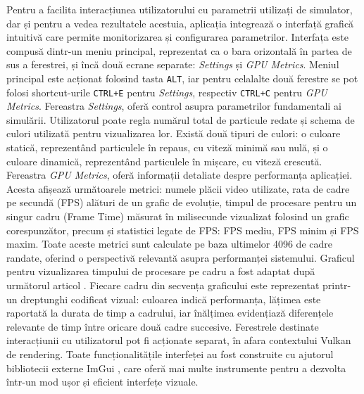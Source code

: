 Pentru a facilita interacțiunea utilizatorului cu parametrii utilizați de simulator, dar și pentru a vedea rezultatele acestuia, aplicația integrează o interfață grafică intuitivă care permite monitorizarea și configurarea parametrilor. Interfața este compusă dintr-un meniu principal, reprezentat ca o bara orizontală în partea de sus a ferestrei, și încă două ecrane separate: \textit{Settings} și \textit{GPU Metrics}. Meniul principal este acționat folosind tasta \texttt{ALT}, iar pentru celalalte două ferestre se pot folosi shortcut-urile \texttt{CTRL+E} pentru \textit{Settings}, respectiv \texttt{CTRL+C} pentru \textit{GPU Metrics}. Fereastra \textit{Settings}, oferă control asupra parametrilor fundamentali ai simulării. Utilizatorul poate regla numărul total de particule redate și schema de culori utilizată pentru vizualizarea lor. Există două tipuri de culori: o culoare statică, reprezentând particulele în repaus, cu viteză minimă sau nulă, și o culoare dinamică, reprezentând particulele în mișcare, cu viteză crescută. Fereastra \textit{GPU Metrics}, oferă informații detaliate despre performanța aplicației. Acesta afișează următoarele metrici: numele plăcii video utilizate, rata de cadre pe secundă (FPS) alături de un grafic de evoluție, timpul de procesare pentru un singur cadru (Frame Time) măsurat în milisecunde vizualizat folosind un grafic corespunzător, precum și statistici legate de FPS: FPS mediu, FPS minim și FPS maxim. Toate aceste metrici sunt calculate pe baza ultimelor 4096 de cadre randate, oferind o perspectivă relevantă asupra performanței sistemului. Graficul pentru vizualizarea timpului de procesare pe cadru a fost adaptat după următorul articol \cite{FrameTimesVisualization_citation}. Fiecare cadru din secvența graficului este reprezentat printr-un dreptunghi codificat vizual: culoarea indică performanța, lățimea este raportată la durata de timp a cadrului, iar înălțimea evidențiază diferențele relevante de timp între oricare două cadre succesive. Ferestrele destinate interacțiunii cu utilizatorul pot fi acționate separat, în afara contextului Vulkan de rendering. Toate funcționalitățile interfeței au fost construite cu ajutorul bibliotecii externe ImGui \cite{ImGui_citation}, care oferă mai multe instrumente pentru a dezvolta într-un mod ușor și eficient interfețe vizuale. 

